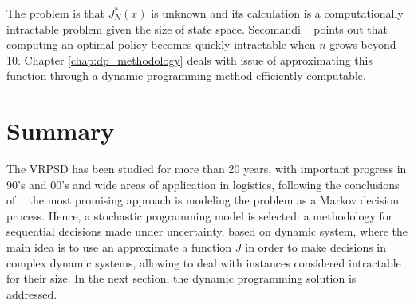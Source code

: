 The problem is that $J_N^*(x)$ is unknown and its calculation is a computationally intractable problem given the size of state space. Secomandi ~\cite{secomandi_rollout_2001} points out that computing an optimal policy becomes quickly intractable when $n$ grows beyond 10. Chapter \ref{chap:dp_methodology} deals with issue of approximating this function through a dynamic-programming method efficiently computable.

\section{Summary}

The VRPSD has been studied for more than 20 years, with important progress in 90's and 00's and wide areas of application in logistics, following the conclusions of ~\cite{Dror_2005} the most promising approach is modeling the problem as a Markov decision process. Hence, a stochastic programming model is selected: a methodology for sequential decisions made under uncertainty, based on dynamic system, where the main idea is to use an approximate a function $J$ in order to make decisions in complex dynamic systems, allowing to deal with instances considered intractable for their size. In the next section, the dynamic programming solution is addressed.
